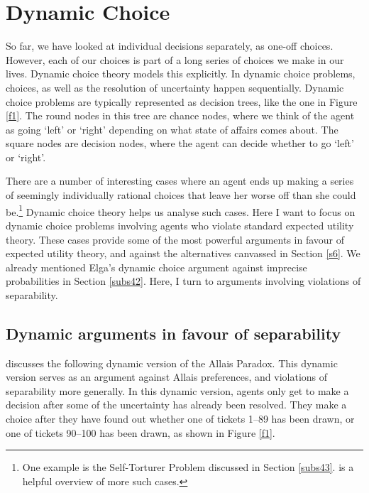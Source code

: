 \section{Dynamic Choice}\label{s7}

So far, we have looked at individual decisions separately, as one-off choices. However, each of our choices is part of a long series of choices we make in our lives. Dynamic choice theory models this explicitly. In dynamic choice problems, choices, as well as the resolution of uncertainty happen sequentially. Dynamic choice problems are typically represented as decision trees, like the one in Figure \ref{f1}. The round nodes in this tree are chance nodes, where we think of the agent as going `left' or `right' depending on what state of affairs comes about. The square nodes are decision nodes, where the agent can decide whether to go `left' or `right'.

There are a number of interesting cases where an agent ends up making a series of seemingly individually rational choices that leave her worse off than she could be.\footnote{One example is the Self-Torturer Problem discussed in Section \ref{subs43}. \citet{Andreou2012} is a helpful overview of more such cases.} Dynamic choice theory helps us analyse such cases. Here I want to focus on dynamic choice problems involving agents who violate standard expected utility theory. These cases provide some of the most powerful arguments in favour of expected utility theory, and against the alternatives canvassed in Section \ref{s6}. We already mentioned Elga's dynamic choice argument against imprecise probabilities in Section \ref{subs42}. Here, I turn to arguments involving violations of separability.

\subsection{Dynamic arguments in favour of separability}\label{subs71}

\citet{Machina1989} discusses the following dynamic version of the Allais Paradox. This dynamic version serves as an argument against Allais preferences, and violations of separability more generally. In this dynamic version, agents only get to make a decision after some of the uncertainty has already been resolved. They make a choice after they have found out whether one of tickets 1--89 has been drawn, or one of tickets 90--100 has been drawn, as shown in Figure \ref{f1}.

